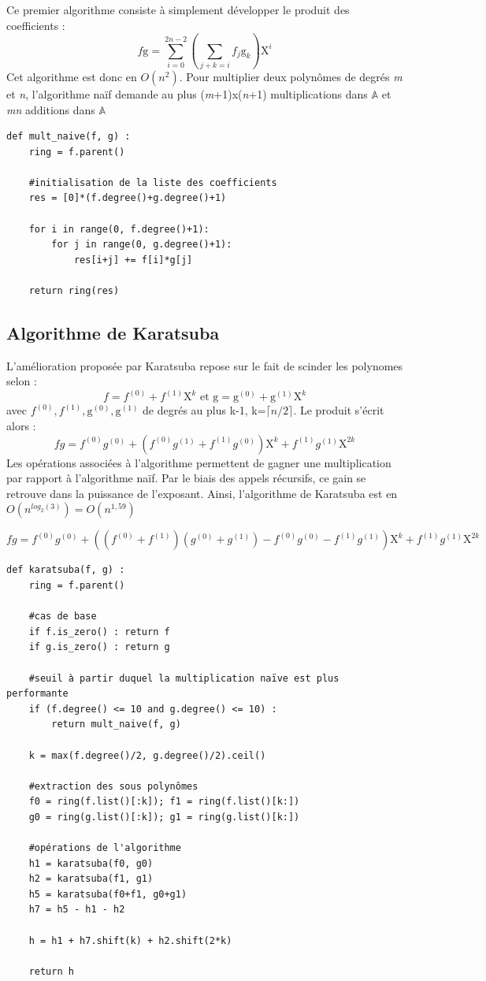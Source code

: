 \documentclass[a4paper]{article}
\begin{document}
Ce premier algorithme consiste à simplement développer le produit des coefficients :
\[
f\text{g}=\sum_{i=0}^{2n-2} (\sum_{j+k=i}f_j\mathrm{g}_k) \mathrm{X}^i
\]
Cet algorithme est donc en $O(n^2)$. Pour multiplier deux polynômes de degrés \textit{m} et \textit{n}, l'algorithme naïf demande au plus (\textit{m}+1)\textsf{x}(\textit{n}+1) multiplications dans $\mathbb{A}$ et
\textit{mn} additions dans $\mathbb{A}$

\begin{lstlisting}[title={multiplication naive}]
    def mult_naive(f, g) :
    ring = f.parent()

    #initialisation de la liste des coefficients
    res = [0]*(f.degree()+g.degree()+1) 
    
    for i in range(0, f.degree()+1):
        for j in range(0, g.degree()+1):
            res[i+j] += f[i]*g[j]

    return ring(res) 
\end{lstlisting}


\subsection{Algorithme de Karatsuba}

L'amélioration proposée par Karatsuba repose sur le fait de scinder les polynomes selon :
\[
f=f^{(0)}+f^{(1)}\mathrm{X}^k\text{ et }\mathrm{g} = \mathrm{g}^{(0)}+\mathrm{g}^{(1)}\mathrm{X}^k
\]
avec $f^{(0)}, f^{(1)}, \mathrm{g}^{(0)}, \mathrm{g}^{(1)}$ de degrés au plus k-1, k=$\lceil n/2 \rceil$. Le produit s'écrit alors :
\[
fg = f^{(0)}g^{(0)}+(f^{(0)}g^{(1)}+f^{(1)}g^{(0)})\mathrm{X}^k+f^{(1)}g^{(1)}\mathrm{X}^{2k} 
\]
Les opérations associées à l'algorithme permettent de gagner une multiplication par rapport à l'algorithme naïf. Par le biais des appels récursifs, ce gain se retrouve dans la puissance de l'exposant.
Ainsi, l'algorithme de Karatsuba est en $O(n^{log_2(3)}) = O(n^{1,59})$

\[
  fg = f^{(0)}g^{(0)}
  +\left((f^{(0)}+f^{(1)}) (g^{(0)} + g^{(1)}) - f^{(0)}g^{(0)} - f^{(1)}g^{(1)}\right)\mathrm{X}^k+
  f^{(1)}g^{(1)}\mathrm{X}^{2k} 
\]


\begin{lstlisting}[title={karatsuba}]
def karatsuba(f, g) :
    ring = f.parent()

    #cas de base
    if f.is_zero() : return f
    if g.is_zero() : return g
    
    #seuil à partir duquel la multiplication naïve est plus performante
    if (f.degree() <= 10 and g.degree() <= 10) : 
        return mult_naive(f, g)

    k = max(f.degree()/2, g.degree()/2).ceil()

    #extraction des sous polynômes
    f0 = ring(f.list()[:k]); f1 = ring(f.list()[k:])
    g0 = ring(g.list()[:k]); g1 = ring(g.list()[k:])

    #opérations de l'algorithme
    h1 = karatsuba(f0, g0)
    h2 = karatsuba(f1, g1)
    h5 = karatsuba(f0+f1, g0+g1)
    h7 = h5 - h1 - h2

    h = h1 + h7.shift(k) + h2.shift(2*k)

    return h
\end{lstlisting}
\end{document}
